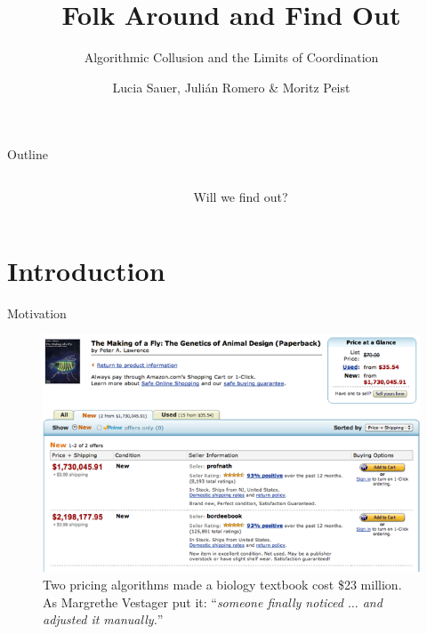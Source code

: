 \documentclass[10pt, aspectratio=169]{beamer}
\title{Folk Around and Find Out}
\subtitle{Algorithmic Collusion and the Limits of Coordination}
\date{}
\author{Lucia Sauer, Julián Romero \& Moritz Peist}
\institute{Barcelona School of Economics}
\begin{document}
\maketitle

\begin{frame}{Outline}
    \begin{columns}[c]
        \begin{column}{0.45\textwidth}
            \tableofcontents
        \end{column}
        \begin{column}{0.45\textwidth}
            \begin{figure}
                \centering
                \caption{Will we find out?}
                \label{fig:fafo}
            \end{figure}
        \end{column}
    \end{columns}
\end{frame}


\section{Introduction}

\begin{frame}{Motivation}
\begin{figure}
        \centering
        \includegraphics[width=0.65\linewidth]{latex/slides_pricing_collusion/imgs/the_making_of_a_fly.png}
        \caption{Two pricing algorithms made a biology textbook cost \$23 million. As Margrethe Vestager \parencite*{vestager_algorithms_2017} put it: \enquote{\emph{someone finally noticed $\ldots$ and adjusted it manually.}}}
        \label{fig:rep_org}
    \end{figure}  
\end{frame}
\end{document}
